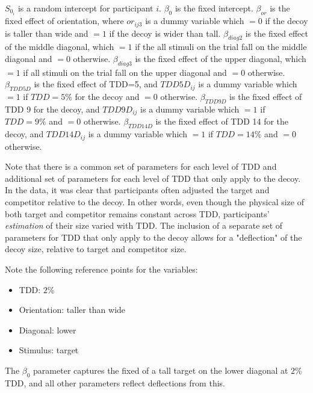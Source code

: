 $S_{0_i}$ is a random intercept for participant $i$. $\beta_{0}$ is the fixed intercept. $\beta_{or}$ is the fixed effect of orientation, where $or_{ij3}$ is a dummy variable which $=0$ if the decoy is taller than wide and $=1$ if the decoy is wider than tall. $\beta_{diag2}$ is the fixed effect of the middle diagonal, which $=1$ if the all stimuli on the trial fall on the middle diagonal and $=0$ otherwise. $\beta_{diag3}$ is the fixed effect of the upper diagonal, which $=1$ if all stimuli on the trial fall on the upper diagonal and $=0$ otherwise. $\beta_{TDD5D}$ is the fixed effect of TDD=5, and $TDD5D_{ij}$ is a dummy variable which $=1$ if $TDD=5\%$ for the decoy and $=0$ otherwise. $\beta_{TDD9D}$ is the fixed effect of TDD 9 for the decoy, and $TDD9D_{ij}$ is a dummy variable which $=1$ if $TDD=9\%$ and $=0$ otherwise. $\beta_{TDD14D}$ is the fixed effect of TDD 14 for the decoy, and $TDD14D_{ij}$ is a dummy variable which $=1$ if $TDD=14\%$ and $=0$ otherwise. 

Note that there is a common set of parameters for each level of TDD and additional set of parameters for each level of TDD that only apply to the decoy. In the data, it was clear that participants often adjusted the target and competitor relative to the decoy. In other words, even though the physical size of both target and competitor remains constant across TDD, participants' \textit{estimation} of their size varied with TDD. The inclusion of a separate set of parameters for TDD that only apply to the decoy allows for a "deflection" of the decoy size, relative to target and competitor size. 

Note the following reference points for the variables:
\begin{itemize}
    \item TDD: $2\%$
    \item Orientation: taller than wide
    \item Diagonal: lower
    \item Stimulus: target
\end{itemize}

The $\beta_{0}$ parameter captures the fixed of a tall target on the lower diagonal at $2\%$ TDD, and all other parameters reflect deflections from this.


